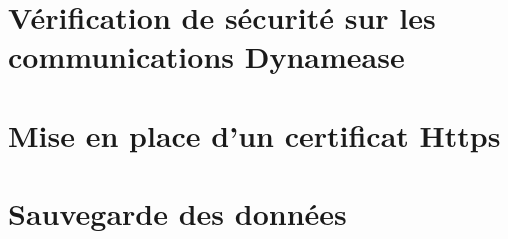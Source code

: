 \section{Vérification de sécurité sur les communications Dynamease}

\section{Mise en place d'un certificat Https}

\section{Sauvegarde des données}